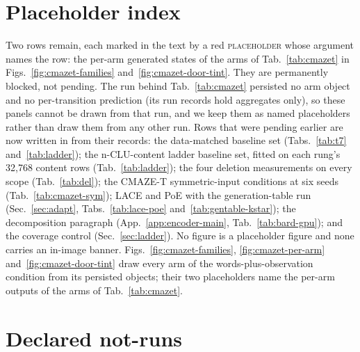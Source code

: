 \documentclass{article} %
\begin{document}
\section{Placeholder index}
\label{app:placeholders}

Two rows remain, each marked in the text by a red \textsc{placeholder} whose argument names
the row: the per-arm generated states of the arms of Tab.~\ref{tab:cmazet} in
Figs.~\ref{fig:cmazet-families} and~\ref{fig:cmazet-door-tint}. They are
permanently blocked, not pending. The run behind Tab.~\ref{tab:cmazet} persisted no arm object and
no per-transition prediction (its run records hold aggregates only), so these panels cannot be drawn
from that run, and we keep them as named placeholders rather than draw them from any other run. Rows
that were pending earlier are now written in from their records: the data-matched baseline set
(Tabs.~\ref{tab:t7} and~\ref{tab:ladder}); the n-CLU-content ladder baseline set, fitted on each rung's
32,768 content rows (Tab.~\ref{tab:ladder}); the four deletion measurements on every scope %
(Tab.~\ref{tab:del}); the CMAZE-T symmetric-input conditions at six seeds
(Tab.~\ref{tab:cmazet-sym}); LACE and PoE with the generation-table run (Sec.~\ref{sec:adapt},
Tabs.~\ref{tab:lace-poe} and~\ref{tab:gentable-kstar}); the decomposition paragraph
(App.~\ref{app:encoder-main}, Tab.~\ref{tab:bard-gpu}); and the coverage control
(Sec.~\ref{sec:ladder}). No figure is a placeholder figure and none carries an in-image banner.
Figs.~\ref{fig:cmazet-families}, \ref{fig:cmazet-per-arm}
and~\ref{fig:cmazet-door-tint} draw every arm of the words-plus-observation condition from its
persisted objects; their two placeholders name the per-arm outputs of the arms of
Tab.~\ref{tab:cmazet}.

\section{Declared not-runs}
\label{app:notrun}
\end{document}
